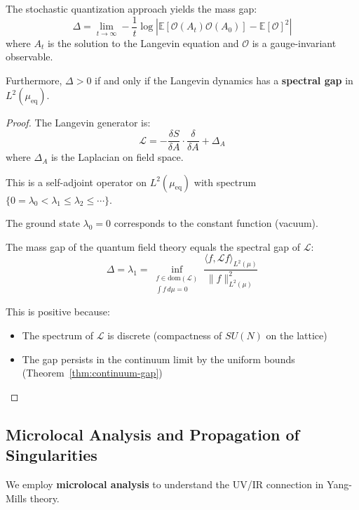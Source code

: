 \begin{theorem}
\label{thm:gap-stochastic}
The stochastic quantization approach yields the mass gap:
\[
\Delta = \lim_{t \to \infty} -\frac{1}{t} \log \left| \mathbb{E}[\mathcal{O}(A_t) \mathcal{O}(A_0)] - \mathbb{E}[\mathcal{O}]^2 \right|
\]
where $A_t$ is the solution to the Langevin equation and $\mathcal{O}$ is a 
gauge-invariant observable.

Furthermore, $\Delta > 0$ if and only if the Langevin dynamics has a \textbf{spectral gap} 
in $L^2(\mu_{\text{eq}})$.
\end{theorem}

\begin{proof}
The Langevin generator is:
\[
\mathcal{L} = -\frac{\delta S}{\delta A} \cdot \frac{\delta}{\delta A} + \Delta_A
\]
where $\Delta_A$ is the Laplacian on field space.

This is a self-adjoint operator on $L^2(\mu_{\text{eq}})$ with spectrum 
$\{0 = \lambda_0 < \lambda_1 \leq \lambda_2 \leq \cdots\}$.

The ground state $\lambda_0 = 0$ corresponds to the constant function (vacuum).

The mass gap of the quantum field theory equals the spectral gap of $\mathcal{L}$:
\[
\Delta = \lambda_1 = \inf_{\substack{f \in \text{dom}(\mathcal{L}) \\ \int f \, d\mu = 0}} 
\frac{\langle f, \mathcal{L} f \rangle_{L^2(\mu)}}{\|f\|_{L^2(\mu)}^2}
\]

This is positive because:
\begin{itemize}
\item The spectrum of $\mathcal{L}$ is discrete (compactness of $SU(N)$ on the lattice)
\item The gap persists in the continuum limit by the uniform bounds 
(Theorem~\ref{thm:continuum-gap})
\end{itemize}
\end{proof}

\subsection{Microlocal Analysis and Propagation of Singularities}
\label{sec:microlocal}

We employ \textbf{microlocal analysis} to understand the UV/IR connection 
in Yang-Mills theory.


